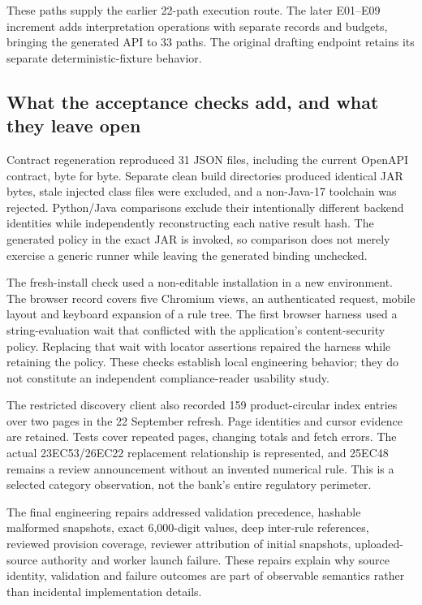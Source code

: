 These paths supply the earlier 22-path execution route. The later E01--E09
increment adds interpretation operations with separate records and budgets,
bringing the generated API to 33 paths. The original drafting endpoint
retains its separate deterministic-fixture behavior.

\subsection{What the acceptance checks add, and what they leave open}

Contract regeneration reproduced 31 JSON files, including the current OpenAPI
contract, byte for byte. Separate clean build directories produced identical
JAR bytes, stale injected class files were excluded, and a non-Java-17 toolchain
was rejected. Python/Java comparisons exclude their intentionally different
backend identities while independently reconstructing each native result hash.
The generated policy in the exact JAR is invoked, so comparison does not merely
exercise a generic runner while leaving the generated binding unchecked.

The fresh-install check used a non-editable installation in a new environment.
The browser record covers five Chromium views, an authenticated request, mobile
layout and keyboard expansion of a rule tree. The first browser harness used a
string-evaluation wait that conflicted with the application's content-security
policy. Replacing that wait with locator assertions repaired the harness while
retaining the policy. These checks establish local engineering behavior; they
do not constitute an independent compliance-reader usability study.

The restricted discovery client also recorded 159 product-circular index
entries over two pages in the 22 September refresh. Page identities and cursor
evidence are retained. Tests cover repeated pages, changing totals and fetch
errors. The actual 23EC53/26EC22 replacement relationship is represented, and
25EC48 remains a review announcement without an invented numerical rule. This
is a selected category observation, not the bank's entire regulatory perimeter.

The final engineering repairs addressed validation precedence, hashable malformed
snapshots, exact 6,000-digit values, deep inter-rule references, reviewed provision
coverage, reviewer attribution of initial snapshots, uploaded-source authority
and worker launch failure. These repairs explain why source identity, validation
and failure outcomes are part of observable semantics rather than incidental
implementation details.

